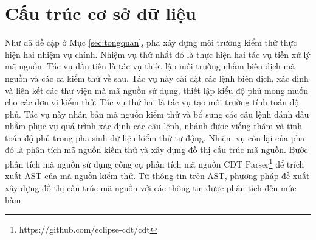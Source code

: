\section{Cấu trúc cơ sở dữ liệu} \label{sec:database-design}
Như đã đề cập ở Mục \autoref{sec:tongquan}, pha xây dựng môi trường kiểm thử thực hiện hai nhiệm vụ chính. Nhiệm vụ thứ nhất đó là thực hiện hai tác vụ tiền xử lý mã nguồn. Tác vụ đầu tiên là tác vụ thiết lập môi trường nhằm biên dịch mã nguồn và các ca kiểm thử về sau. Tác vụ này cài đặt các lệnh biên dịch, xác định và liên kết các thư viện mà mã nguồn sử dụng, thiết lập kiểu độ phủ mong muốn cho các đơn vị kiểm thử. Tác vụ thứ hai là tác vụ tạo môi trường tính toán độ phủ. Tác vụ này nhân bản mã nguồn kiểm thử và bổ sung các câu lệnh đánh dấu nhằm phục vụ quá trình xác định các câu lệnh, nhánh được viếng thăm và tính toán độ phủ trong pha sinh dữ liệu kiểm thử tự động. Nhiệm vụ còn lại của pha đó là phân tích mã nguồn kiểm thử và xây dựng đồ thị cấu trúc mã nguồn. Bước phân tích mã nguồn sử dụng công cụ phân tích mã nguồn CDT Parser\footnote{https://github.com/eclipse-cdt/cdt} để trích xuất AST của mã nguồn kiểm thử. Từ thông tin trên AST, phương pháp đề xuất xây dựng đồ thị cấu trúc mã nguồn với các thông tin được phân tích đến mức hàm.

